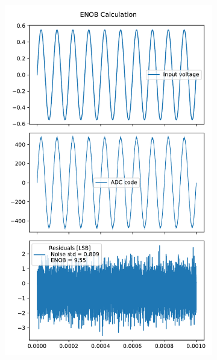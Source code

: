 \documentclass[varwidth]{standalone}
\begin{document}
\begin{figure}
\begin{subfigure}{0.32\textwidth}
    \includegraphics[width=\textwidth]{enob.pdf}
  \end{subfigure}
  \begin{subfigure}{0.32\textwidth}
    \begin{table}
      \let\center\empty
      \let\endcenter\relax
      \centering
      \resizebox{0.4\width}{!}{}
    \end{table}

\end{subfigure}
\end{figure}
\end{document}
